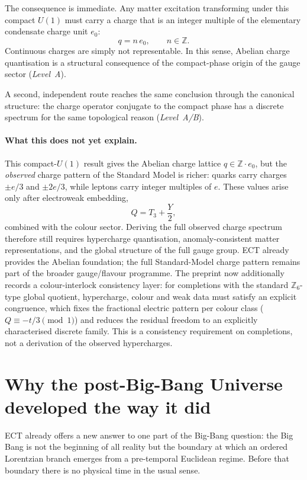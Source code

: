 \documentclass[11pt,a4paper]{article}
\begin{document}
The consequence is immediate. Any matter excitation transforming
under this compact $U(1)$ must carry a charge that is an integer
multiple of the elementary condensate charge unit $e_0$:
\[
q = n\,e_0, \qquad n\in\mathbb{Z}.
\]
Continuous charges are simply not representable. In this sense,
Abelian charge quantisation is a structural consequence of the
compact-phase origin of the gauge sector (\emph{Level~A}).

A second, independent route reaches the same conclusion through the
canonical structure: the charge operator conjugate to the compact
phase has a discrete spectrum for the same topological reason
(\emph{Level~A/B}).

\paragraph{What this does not yet explain.}
This compact-$U(1)$ result gives the Abelian charge lattice
$q\in \mathbb{Z}\cdot e_0$, but the \emph{observed} charge pattern of
the Standard Model is richer: quarks carry charges $\pm e/3$ and
$\pm 2e/3$, while leptons carry integer multiples of $e$.
These values arise only after electroweak embedding,
\[
Q = T_3 + \frac{Y}{2},
\]
combined with the colour sector. Deriving the full observed charge
spectrum therefore still requires hypercharge quantisation,
anomaly-consistent matter representations, and the global structure
of the full gauge group. ECT already provides the Abelian foundation;
the full Standard-Model charge pattern remains part of the broader
gauge/flavour programme. The preprint now additionally records a
colour-interlock consistency layer: for completions with the
standard $\mathbb{Z}_6$-type global quotient, hypercharge, colour
and weak data must satisfy an explicit congruence, which fixes the
fractional electric pattern per colour class
($Q \equiv -t/3 \pmod 1$) and reduces the residual freedom to an
explicitly characterised discrete family. This is a consistency
requirement on completions, not a derivation of the observed
hypercharges.

\section{Why the post-Big-Bang Universe developed the way it did}
\label{sec:pop_post_transition}

ECT already offers a new answer to one part of the Big-Bang
question: the Big Bang is not the beginning of all reality but the
boundary at which an ordered Lorentzian branch emerges from a
pre-temporal Euclidean regime.  Before that boundary there is no
physical time in the usual sense.
\end{document}
